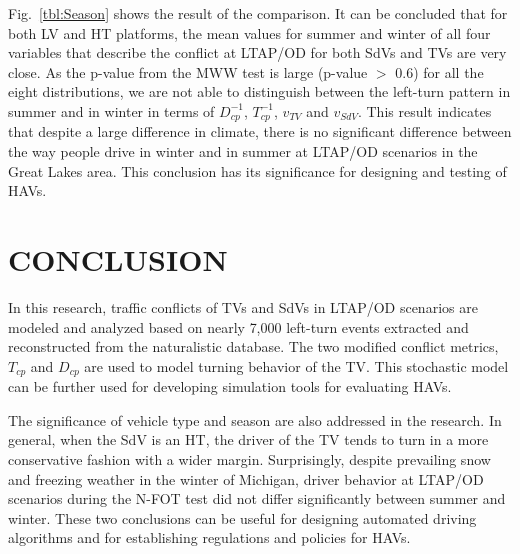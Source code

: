\documentclass[letterpaper, 10 pt, conference]{ieeeconf}
\begin{document}
Fig.~\ref{tbl:Season} shows the result of the comparison. It can be concluded that for both LV and HT platforms, the mean values for summer and winter of all four variables that describe the conflict at LTAP/OD for both SdVs and TVs are very close. As the p-value from the MWW test is large (p-value $>$ 0.6) for all the eight distributions, we are not able to distinguish between the left-turn pattern in summer and in winter in terms of $D_{cp}^{-1}$, $T_{cp}^{-1}$, $v_{TV}$ and $v_{SdV}$. This result indicates that despite a large difference in climate, there is no significant difference between the way people drive in winter and in summer at LTAP/OD scenarios in the Great Lakes area. This conclusion has its significance for designing and testing of HAVs. %
\section{CONCLUSION}

In this research, traffic conflicts of TVs and SdVs in LTAP/OD scenarios are modeled and analyzed based on nearly 7,000 left-turn events extracted and reconstructed from the naturalistic database. The two modified conflict metrics, $T_{cp}$ and $D_{cp}$ are used to model turning behavior of the TV. This stochastic model can be further used for developing simulation tools for evaluating HAVs.

The significance of vehicle type and season are also addressed in the research. In general, when the SdV is an HT, the driver of the TV tends to turn in a more conservative fashion with a wider margin. Surprisingly, despite prevailing snow and freezing weather in the winter of Michigan, driver behavior at LTAP/OD scenarios during the N-FOT test did not differ significantly between summer and winter. These two conclusions can be useful for designing automated driving algorithms and for establishing regulations and policies for HAVs.
\end{document}
